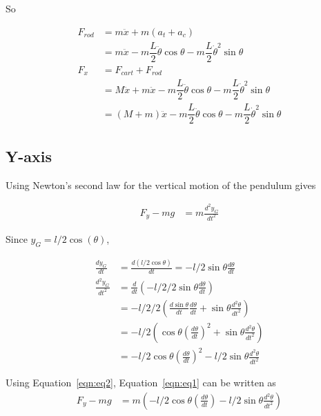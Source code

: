 \documentclass{notes}
\begin{document}
So 

\begin{align*}
  F_{rod} & = m \ddot{x} + m (a_{t} + a_{c}) \\
         & = m \ddot{x} -m\dfrac{L}{2} \ddot{\theta} \cos \theta 
                        -m\dfrac{L}{2} \dot{\theta}^2 \sin \theta \\
  F_x & = F_{cart} + F_{rod} \\
      & = M\ddot{x} + m \ddot{x} - m\dfrac{L}{2} \ddot{\theta} \cos \theta 
                    - m \dfrac{L}{2} \dot{\theta}^2 \sin \theta \\
      & = (M + m) \ddot{x} - m\dfrac{L}{2} \ddot{\theta} \cos \theta 
                    - m \dfrac{L}{2} \dot{\theta}^2 \sin \theta
\end{align*}
\FloatBarrier


\subsection{Y-axis}
Using Newton's second law for the vertical motion of the pendulum gives

\begin{align}
  F_y - mg & = m\frac{d^2y_G}{dt^2}\label{eqn:eq1}
 \end{align}
 
 Since $ y_G = l/2\cos(\theta)$,

 \begin{align}
   \frac{dy_G}{dt} & = \frac{d(l/2\cos\theta)}{dt} = -l/2\sin\theta\frac{d\theta}{dt} \nonumber\\
   \frac{d^2y_G}{dt^2} & = \frac{d}{dt}\left(-l/2/2 \sin\theta \frac{d\theta}{dt}\right) \nonumber\\
   & = -l/2/2\left(\frac{d\sin\theta}{dt}\frac{d\theta}{dt} + \sin\theta\frac{d^2\theta}{dt^2}\right) \nonumber\\
   & = -l/2\left( \cos\theta \left(\frac{d\theta}{dt}\right)^2 + \sin\theta\frac{d^2\theta}{dt^2}   \right) \nonumber\\
   & = -l/2\cos\theta\left(\frac{d\theta}{dt}\right)^2-l/2\sin\theta\frac{d^2\theta}{dt^2}\label{eqn:eq2}
 \end{align}
 
 Using Equation~\ref{eqn:eq2}, Equation~\ref{eqn:eq1} can be written as 
 \begin{align*}
   F_y - mg & = m\left(-l/2\cos\theta\left(\frac{d\theta}{dt}\right) - l/2\sin\theta\frac{d^2\theta}{dt^2}\right)
 \end{align*}
 
\end{document}
